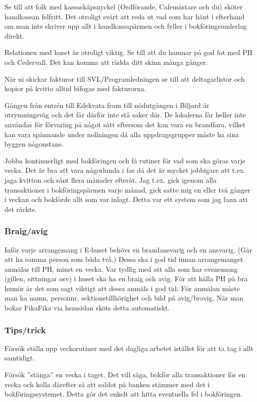 \documentclass[10pt]{article}
\begin{document}
Se till att folk med kassaskåpsnyckel (Ordförande, Cafemästare och du) sköter handkassan felfritt. Det otroligt svårt att reda ut vad som har hänt i efterhand om man inte skriver upp allt i handkassapärmen och fyller i bokföringsunderlag direkt. 

Relationen med huset är otroligt viktig. Se till att du hamnar på god fot med PH och Cedervall. Det kan komma att rädda ditt skinn många gånger.

När ni skickar fakturor till SVL/Programledningen se till att deltagarlistor och kopior på kvitto alltid bifogas med fakturorna.

Gången från entrén till Edekvata fram till nödutgången i Biljard är utrymningsväg och det får därför inte stå saker där. De lokalerna får heller inte användas för förvaring på något sätt eftersom det kan vara en brandfara, vilket kan vara spännande under nollningen då alla uppdragsgrupper måste ha sina byggen någonstans.

Jobba kontinuerligt med bokföringen och få rutiner för vad som ska göras varje vecka. Det är bra att vara någorlunda i fas då det är mycket jobbigare att t.ex. jaga kvitton och sånt flera månader efteråt. Jag t.ex. gick igenom alla transaktioner i bokföringspärmen varje månad, gick satte mig en eller två gånger i veckan och bokförde allt som var inlagt. Detta var ett system som jag fann att det räckte.

\subsubsection{Braig/avig}
Inför varje arrangemang i E-huset behövs en brandansvarig och en ansvarig. (Går att ha samma person som båda två.) Dessa ska i god tid innan arrangemanget anmälas till PH, minst en vecka. Var tydlig med att alla som har evenemang (gillen, sittningar osv) i huset ska ha en braig och avig. För att hålla PH på bra humör är det som sagt viktigt att dessa anmäls i god tid. För anmälan måste man ha namn, personnr, sektionstillhörighet och bild på avig/bravig. När man bokar FikaFika via hemsidan sköts detta automatiskt.

\subsubsection{Tips/trick}
Försök ställa upp veckorutiner med det dagliga arbetet istället för att ta tag i allt samtidigt. 

Försök ”stänga” en vecka i taget. Det vill säga, bokför alla transaktioner för en vecka och kolla därefter så att saldot på banken stämmer med det i bokföringssystemet. Detta gör det enkelt att hitta eventuella fel i bokföringen.
\end{document}
